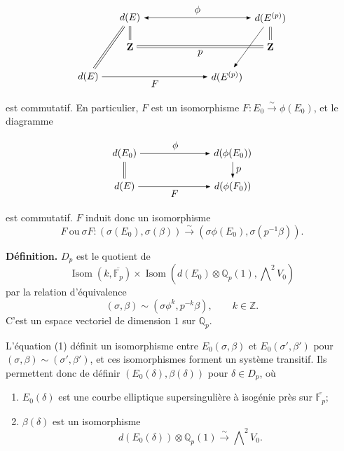 \documentclass[11pt]{article}
\newcommand{\Z}{\mathbb{Z}}
\newcommand{\Fp}{\mathbb{F}_{p}}
\newcommand{\Qp}{\mathbb{Q}_{p}}
\newcommand{\Isom}{\operatorname{Isom}}
\begin{document}
\[
\begin{tikzpicture}[x=1.2cm,y=0.9cm,>=Latex,baseline=(current bounding box.center)]
  \node (tl) at (0,2.2) {$d(E)$};
  \node (tr) at (4.2,2.2) {$d(E^{(p)})$};
  \node (ml) at (0.0,1.05) {$\mathbf Z$};
  \node (mr) at (4.2,1.05) {$\mathbf Z$};
  \node (bl) at (-1.25,-0.15) {$d(E)$};
  \node (br) at (2.9,-0.15) {$d(E^{(p)})$};
  \draw[<->] (tl) -- node[above] {$\phi$} (tr);
  \draw[double distance=1.5pt] (tl) -- (ml);
  \draw[double distance=1.5pt] (tr) -- (mr);
  \draw[double distance=1.5pt] (ml) -- node[below] {$p$} (mr);
  \draw[double distance=1.5pt] (bl) -- (tl);
  \draw[->] (tr) -- (br);
  \draw[->] (bl) -- node[below] {$F$} (br);
\end{tikzpicture}
\]

est commutatif. En particulier, \(F\) est un isomorphisme \(F:E_0\xrightarrow{\sim}\phi(E_0)\), et le diagramme

\[
\begin{tikzpicture}[x=1.05cm,y=0.85cm,>=Latex,baseline=(current bounding box.center)]
  \node (a) at (0,1.4) {$d(E_0)$};
  \node (b) at (3.7,1.4) {$d(\phi(E_0))$};
  \node (c) at (0,0) {$d(E)$};
  \node (d) at (3.7,0) {$d(\phi(F_0))$};
  \draw[->] (a) -- node[above] {$\phi$} (b);
  \draw[double distance=1.5pt] (a) -- (c);
  \draw[->] (b) -- node[right] {$p$} (d);
  \draw[->] (c) -- node[below] {$F$} (d);
\end{tikzpicture}
\]

est commutatif. \(F\) induit donc un isomorphisme
\[
\tag{1}
F\ \text{ou}\ \sigma F:(\sigma(E_0),\sigma(\beta))
\xrightarrow{\sim}
(\sigma\phi(E_0),\sigma(p^{-1}\beta)).
\]

\textbf{Définition.} \(D_p\) est le quotient de
\[
\Isom(k,\overline{\Fp})\times
\Isom\!\left(d(E_0)\otimes\Qp(1),\bigwedge\nolimits^2V_0\right)
\]
par la relation d'équivalence
\[
(\sigma,\beta)\sim(\sigma\phi^k,p^{-k}\beta),\qquad k\in\Z .
\]
C'est un espace vectoriel de dimension \(1\) sur \(\Qp\).

L'équation (1) définit un isomorphisme entre \(E_0(\sigma,\beta)\) et \(E_0(\sigma',\beta')\) pour \((\sigma,\beta)\sim(\sigma',\beta')\), et ces isomorphismes forment un système transitif. Ils permettent donc de définir \((E_0(\delta),\beta(\delta))\) pour \(\delta\in D_p\), où
\begin{enumerate}[label=(\alph*)]
\item \(E_0(\delta)\) est une courbe elliptique supersingulière à isogénie près sur \(\overline{\Fp}\);
\item \(\beta(\delta)\) est un isomorphisme
\[
d(E_0(\delta))\otimes\Qp(1)\xrightarrow{\sim}\bigwedge\nolimits^2V_0 .
\]
\end{enumerate}
\end{document}
